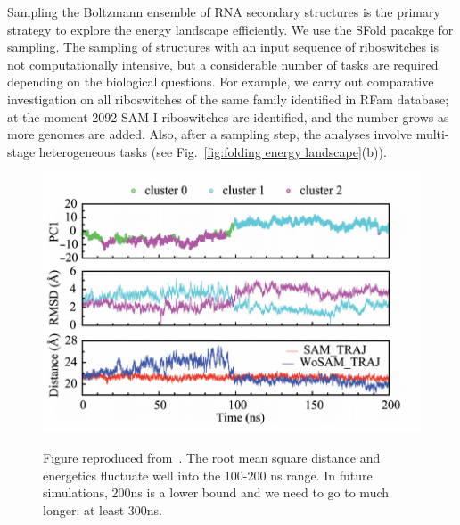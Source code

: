 \documentclass[a4paper,10pt]{article}
\newcommand{\up}{\vspace*{-1em}}
\begin{document}
Sampling the Boltzmann ensemble of RNA secondary structures is the primary strategy to explore the energy landscape efficiently.  We use the SFold pacakge\cite{ding2006} for sampling. The sampling of structures with an input sequence of riboswitches is not computationally intensive, but a considerable number of tasks are required depending on the biological questions.  For example, we carry out comparative investigation on all riboswitches of the same family identified in RFam database; at the moment 2092 SAM-I riboswitches are identified, and the number grows as more genomes are added.  Also, after a sampling step, the analyses involve multi-stage heterogeneous tasks (see Fig.~\ref{fig:folding energy landscape}(b)).  


\begin{figure}%
\begin{center}
  \includegraphics[scale=0.4]{Figure3}
   \caption{ Figure reproduced from~\cite{SAM-I-NAR2009}. The root mean square distance and energetics fluctuate well into the 100-200 ns range. In future simulations, 200ns is a lower bound and we need to go to much longer: at least 300ns.
}
\up\up
\label{fig:Fig3}
\end{center}
\end{figure}
\end{document}

